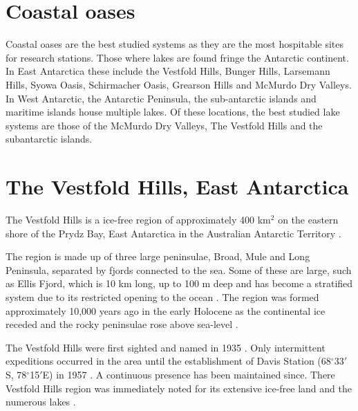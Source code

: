 \section{Coastal oases}
Coastal oases are the best studied systems as they are the most hospitable sites for research stations.
Those where lakes are found fringe the Antarctic continent.
In East Antarctica these include the Vestfold Hills, Bunger Hills, Larsemann Hills, Syowa Oasis, Schirmacher Oasis, Grearson Hills and McMurdo Dry Valleys.
In West Antarctic, the Antarctic Peninsula, the sub-antarctic islands and maritime islands house multiple lakes. 
Of these locations, the best studied lake systems are those of the McMurdo Dry Valleys, The Vestfold Hills and the subantarctic islands.


\section{The Vestfold Hills, East Antarctica}
The Vestfold Hills  is a ice-free region of approximately 400 km$^2$ on the eastern shore of the Prydz Bay, East Antarctica in the Australian Antarctic Territory \cite{Gibson1999}.

The region is made up of three large peninsulae, Broad, Mule and Long Peninsula, separated by fjords connected to the sea.
Some of these are large, such as Ellis Fjord, which is 10 km long, up to 100 m deep and has become a stratified system due to its restricted opening to the ocean \cite{Burke1988}.
The region was formed approximately 10,000 years ago in the early Holocene as the continental ice receded and the rocky peninsulae rose above sea-level \cite{Zwartz1998}. 

The Vestfold Hills were first sighted and named in 1935 \cite{Law1959}.
Only intermittent expeditions occurred in the area until the establishment of Davis Station (68$^{\circ}$33$'$S, 78$^{\circ}$15$'$E) in 1957 \cite{Law1959}. 
A continuous presence has been maintained since. %
There Vestfold Hills region was immediately noted for its extensive ice-free land and the numerous lakes \cite{Johnstone1973}.


